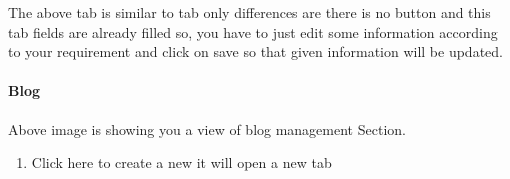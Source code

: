 \documentclass[a4paper,10pt,english]{report}
\begin{document}
The above tab is similar to  tab only differences are there is no  button and this tab fields are already filled so, you have to just edit some information according to your requirement and click on save so that given information will be updated.


\paragraph{Blog}
\label{\detokenize{blog:blog}}\label{\detokenize{blog:id1}}\label{\detokenize{blog::doc}}
\begin{figure}[htbp]
\centering

\noindent{}
\end{figure}

Above image is showing you a view of blog management Section.
\begin{enumerate}
\def\theenumi{\arabic{enumi}}
\def\labelenumi{\theenumi .}
\makeatletter\def\p@enumii{\p@enumi \theenumi .}\makeatother
\item {} 
Click here to create a new  it will open a new tab

\end{enumerate}

\begin{figure}[htbp]
\centering

\noindent{}
\end{figure}
\end{document}

